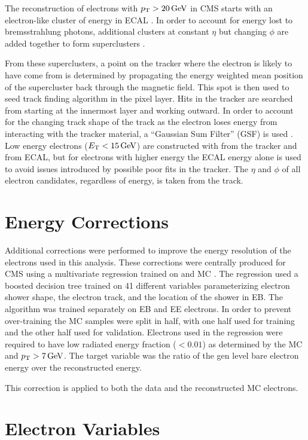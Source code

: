 The reconstruction of electrons with $p_{\mathrm{T}} > 20 \,\text{Ge\hspace{-.08em}V}$ in CMS starts with an
electron-like cluster of energy in ECAL \cite{eg_reco_2010}. In order to
account for energy lost to bremsstrahlung photons, additional clusters at
constant $\eta$ but changing $\phi$ are added together to form superclusters
\cite{baffioni_2007}.

From these superclusters, a point on the tracker where the electron is likely
to have come from is determined by propagating the energy weighted mean
position of the supercluster back through the magnetic field. This spot is then
used to seed  track finding algorithm in the pixel layer. Hits in the tracker
are searched from starting at the innermost layer and working outward. In order
to account for the changing track shape of the track as the electron loses
energy from interacting with the tracker material, a ``Gaussian Sum Filter''
(GSF) is used \cite{adam_2005}. Low energy electrons ($E_{\mathrm{T}} < 15 \,\text{Ge\hspace{-.08em}V}$) are
constructed with \pt from the tracker and \ET from ECAL, but for electrons with
higher energy the ECAL energy alone is used to avoid issues introduced by
possible poor fits in the tracker. The $\eta$ and $\phi$ of all electron
candidates, regardless of energy, is taken from the track.

\section{Energy Corrections}

Additional corrections were performed to improve the energy resolution of the
electrons used in this analysis. These corrections were centrally produced for
CMS using a multivariate regression trained on \Ztoee and \higgstoZZ MC
\cite{cms_an_2012-327}. The regression used a boosted decision tree trained on
41 different variables parameterizing electron shower shape, the electron
track, and the location of the shower in EB. The algorithm was trained
separately on EB and EE electrons. In order to prevent over-training the MC
samples were split in half, with one half used for training and the other half
used for validation. Electrons used in the regression were required to have low
radiated energy fraction ($< 0.01$) as determined by the MC and $p_{\mathrm{T}} > 7 \,\text{Ge\hspace{-.08em}V}$.
The target variable was the ratio of the gen level bare electron energy over
the reconstructed energy.

This correction is applied to both the data and the reconstructed MC electrons.

\section{Electron Variables}
\label{sec:electron_variables}

